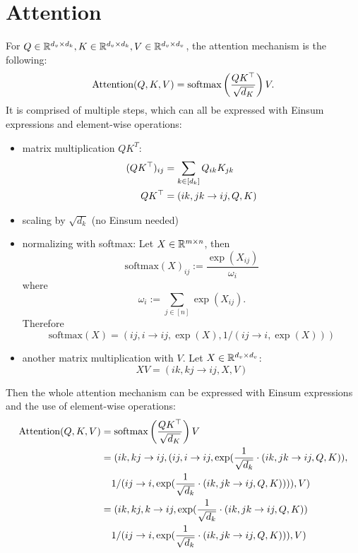 \section{Attention}
For $Q \in \mathbb{R}^{d_v \times d_k}, K \in \mathbb{R}^{d_v \times d_k}, V \in \mathbb{R}^{d_v \times d_v}$, the attention mechanism is the following:
$$\text{Attention}(Q,K,V) = \text{softmax}\left(\frac{Q K^\top}{\sqrt{d_K}}\right)V.$$
It is comprised of multiple steps, which can all be expressed with Einsum expressions and element-wise operations:
\begin{itemize}
      \item matrix multiplication $Q K^T$:
            \begin{align*}
                  (QK^\top)_{ij} & = \sum\limits_{k \in [d_k]} Q_{ik} K_{jk} \\
                  QK^\top        & = (ik, jk \rightarrow ij, Q, K)
            \end{align*}
      \item scaling by $\sqrt{d_k}$ (no Einsum needed)
      \item normalizing with softmax: Let $X \in \mathbb{R}^{m \times n}$, then
            $$\text{softmax}(X)_{ij} := \frac{\exp(X_{ij})}{\omega_i}$$
            where
            $$\omega_i := \sum\limits_{j \in [n]} \exp(X_{ij}).$$
            Therefore
            $$\text{softmax}(X) = (ij, i \rightarrow ij, \exp(X), 1 / (ij \rightarrow i, \exp(X)))$$
      \item another matrix multiplication with $V$. Let $X \in \mathbb{R}^{d_v \times d_v}$:
            $$X V = (ik, kj \rightarrow ij, X, V)$$
\end{itemize}

Then the whole attention mechanism can be expressed with Einsum expressions and the use of element-wise operations:
\begin{align*}
      \text{Attention}(Q, K, V) & = \text{softmax}\left(\frac{Q K^\T}{\sqrt{d_K}}\right)V                                                          \\
                                & = (ik, kj \rightarrow ij, (ij, i \rightarrow ij, \exp(\frac{1}{\sqrt{d_k}} \cdot (ik, jk \rightarrow ij, Q, K)), \\
                                & \phantom{{}=} 1 / (ij \rightarrow i, \exp(\frac{1}{\sqrt{d_k}} \cdot (ik, jk \rightarrow ij, Q, K)))), V)        \\
                                & = (ik, kj, k \rightarrow ij, \exp(\frac{1}{\sqrt{d_k}} \cdot (ik, jk \rightarrow ij, Q, K))                      \\
                                & \phantom{{}=} 1 / (ij \rightarrow i, \exp(\frac{1}{\sqrt{d_k}} \cdot (ik, jk \rightarrow ij, Q, K))), V)
\end{align*}
